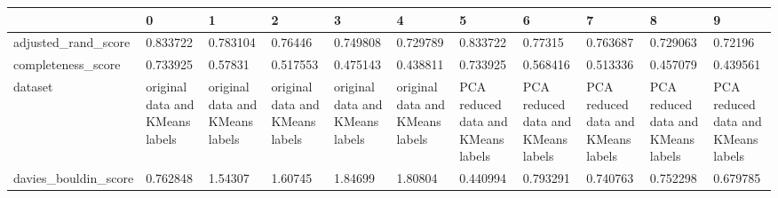 \begin{tabular}{lllllllllll}
\toprule
{} &                                                  0 &                                                  1 &                                                  2 &                                                  3 &                                                  4 &                                                  5 &                                                  6 &                                                  7 &                                                  8 &                                                  9 \\
\midrule
adjusted\_rand\_score   &                                           0.833722 &                                           0.783104 &                                            0.76446 &                                           0.749808 &                                           0.729789 &                                           0.833722 &                                            0.77315 &                                           0.763687 &                                           0.729063 &                                            0.72196 \\
completeness\_score    &                                           0.733925 &                                            0.57831 &                                           0.517553 &                                           0.475143 &                                           0.438811 &                                           0.733925 &                                           0.568416 &                                           0.513336 &                                           0.457079 &                                           0.439561 \\
dataset               &                    original data and KMeans labels &                    original data and KMeans labels &                    original data and KMeans labels &                    original data and KMeans labels &                    original data and KMeans labels &                 PCA reduced data and KMeans labels &                 PCA reduced data and KMeans labels &                 PCA reduced data and KMeans labels &                 PCA reduced data and KMeans labels &                 PCA reduced data and KMeans labels \\
davies\_bouldin\_score  &                                           0.762848 &                                            1.54307 &                                            1.60745 &                                            1.84699 &                                            1.80804 &                                           0.440994 &                                           0.793291 &                                           0.740763 &                                           0.752298 &                                           0.679785 \\

\end{tabular}
